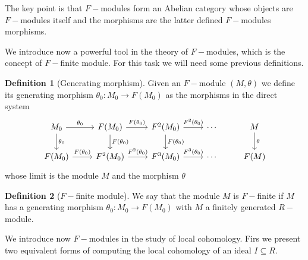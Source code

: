 \documentclass[leqno]{article}
\theoremstyle{definition}
\newtheorem{definition}{Definition}[section]
\begin{document}
The key point is that $F-$modules form an Abelian category whose objects are  $F-$modules itself and the morphisms are the latter defined  $F-$modules morphisms.

We introduce now a powerful tool in the theory of $F-$modules, which is the concept of  $F-$finite module. For this task we will need some previous definitions.

\begin{definition}[Generating morphism] Given an $F-$module  $(M, \theta )$ we define its generating morphism  $\theta_0 :M_0 \to F(M_0)$ as the morphisms in the direct system 
\[\begin{tikzcd}
	{M_0} & {F(M_0)} & {F^2(M_0)} & \cdots & M \\
	{F(M_0)} & {F^2(M_0)} & {F^3(M_0)} & \cdots & {F(M)}
	\arrow["{\theta_0}", from=1-1, to=1-2]
	\arrow["{F(\theta_0)}", from=2-1, to=2-2]
	\arrow["{F^2(\theta_0)}", from=2-2, to=2-3]
	\arrow["{F(\theta_0)}", from=1-2, to=1-3]
	\arrow["{\theta_0}", from=1-1, to=2-1]
	\arrow["{F(\theta_0)}", from=1-2, to=2-2]
	\arrow["{F(\theta_0)}", from=1-3, to=2-3]
	\arrow["{F^2(\theta_0)}", from=1-3, to=1-4]
	\arrow["{F^3(\theta_0)}", from=2-3, to=2-4]
	\arrow["\theta", from=1-5, to=2-5]
\end{tikzcd}\]
whose limit is the module $M$ and the morphism $\theta$ 
\end{definition}

\begin{definition}[$F-$finite module] We say that the module $M$ is  $F-$finite if  $M$ has a generating morphism  $\theta _0 : M_0 \to F(M_0)$ with $M$ a finitely generated  $R-$module.
\end{definition}







We introduce now  $F-$modules in the study of local cohomology. Firs we present two equivalent forms of computing the local cohomology of an ideal  $I\subseteq R$.
\end{document}
